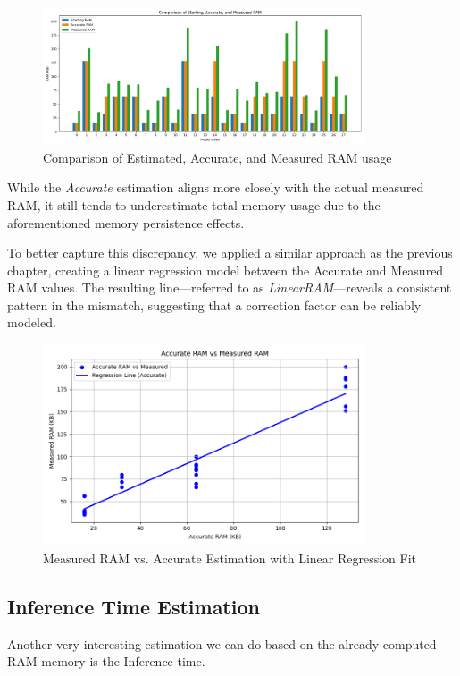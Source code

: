 \begin{figure}[h]
  \centering
  \includegraphics[width=0.85\textwidth]{Pictures/InitialAccurateMeasured.png}
  \caption{Comparison of Estimated, Accurate, and Measured RAM usage}
  \label{fig:initial-ram-comparison}
\end{figure}

While the \textit{Accurate} estimation aligns more closely with the actual measured RAM, it still tends to underestimate total memory usage due to the aforementioned memory persistence effects.

To better capture this discrepancy, we applied a similar approach as the previous chapter, creating a linear regression model between the Accurate and Measured RAM values. The resulting line—referred to as \textit{LinearRAM}—reveals a consistent pattern in the mismatch, suggesting that a correction factor can be reliably modeled.

\begin{figure}[h]
  \centering
  \includegraphics[width=0.85\textwidth]{Pictures/ram_accurate_vs_measured.png}
  \caption{Measured RAM vs. Accurate Estimation with Linear Regression Fit}
  \label{fig:ram-linear-regression}
\end{figure}


\clearpage


\subsection{Inference Time Estimation}
Another very interesting estimation we can do based on the already computed RAM memory is the Inference time.


